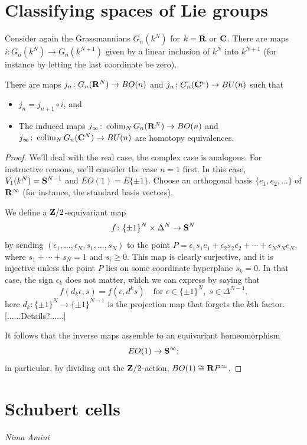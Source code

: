 \documentclass[a4paper,openany]{scrbook}
\newcommand{\chapterauthor}[1]{\hfill\emph{#1}\par\noindent}
\begin{document}
\section{Classifying spaces of Lie groups} \label{sec:classifying-spaces}

Consider again the Grassmannians $G_n(k^N)$ for $k=\R$ or $\CC$. There are maps $i\colon G_n(k^N) \to G_n(k^{N+1})$ given by a linear inclusion of $k^N$ into $k^{N+1}$ (for instance by letting the last coordinate be zero).
\begin{thm}
There are maps $j_n\colon G_n(\R^N) \to BO(n)$ and $j_n\colon G_n(\CC^n) \to BU(n)$ such that
\begin{itemize}
\item $j_n = j_{n+1} \circ i$, and
\item The induced maps $j_\infty\colon \colim_N G_n(\R^N) \to BO(n)$ and $j_\infty\colon \colim_N G_n(\CC^N) \to BU(n)$ are homotopy equivalences.
\end{itemize}
\end{thm}
\begin{proof}
We'll deal with the real case, the complex case is analogous. For instructive reasons, we'll consider the case $n=1$ first. In this case, $V_1(k^N) = \S^{N-1}$ and $EO(1) = E\{\pm 1\}$.
Choose an orthogonal basis $\{e_1,e_2,\dots\}$ of $\R^\infty$ (for instance, the standard basis vectors). 

We define a $\Z/2$-equivariant map
\[
f\colon \{\pm 1\}^N \times \Delta^N \to \S^N
\]
by sending $(\epsilon_1,\dots,\epsilon_N,s_1,\dots,s_N)$ to the point $P = \epsilon_1s_1e_1+\epsilon_2s_2e_2+\cdots+\epsilon_Ns_Ne_N$, where $s_1+\cdots+s_N = 1$ and $s_i \geq 0$. This map is clearly surjective, and it is injective unless the point $P$ lies on some coordinate hyperplane $s_k=0$. In that case, the sign $\epsilon_k$ does not matter, which we can express by saying that
\[
f(d_k\epsilon,s) = f(\epsilon,d^ks) \quad \text{for }\epsilon \in \{\pm 1\}^N, \; s \in \Delta^{N-1}.
\]
here $d_k\colon \{\pm 1\}^N \to \{\pm 1\}^{N-1}$ is the projection map that forgets the $k$th factor. [......Details?......]

It follows that the inverse maps assemble to an equivariant homeomorphism
\[
EO(1) \to \S^\infty;
\]
in particular, by dividing out the $\Z/2$-action, $BO(1) \cong \R P^\infty$.
\end{proof}

\section{Schubert cells}
\chapterauthor{Nima Amini}
\end{document}
